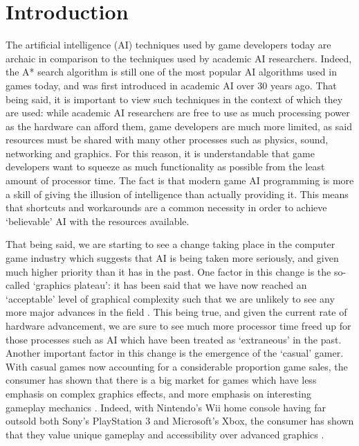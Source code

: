 \documentclass[a4paper,oneside]{report}
\begin{document}
%
%

\chapter{Introduction}

The artificial intelligence (AI) techniques used by game developers today are archaic in comparison to the techniques used by academic AI researchers. Indeed, the A* search algorithm is still one of the most popular AI algorithms used in games today, and was first introduced in academic AI over 30 years ago. That being said, it is important to view such techniques in the context of which they are used: while academic AI researchers are free to use as much processing power as the hardware can afford them, game developers are much more limited, as said resources must be shared with many other processes such as physics, sound, networking and graphics. For this reason, it is understandable that game developers want to squeeze as much functionality as possible from the least amount of processor time. The fact is that modern game AI programming is more a skill of giving the illusion of intelligence than actually providing it. This means that shortcuts and workarounds are a common necessity in order to achieve `believable' AI with the resources available. 

That being said, we are starting to see a change taking place in the computer game industry which suggests that AI is being taken more seriously, and given much higher priority than it has in the past. One factor in this change is the so-called `graphics plateau': it has been said that we have now reached an `acceptable' level of graphical complexity such that we are unlikely to see any more major advances in the field \cite{Sheffield:2008fk}. This being true, and given the current rate of hardware advancement, we are sure to see much more processor time freed up for those processes such as AI which have been treated as `extraneous' in the past. Another important factor in this change is the emergence of the `casual' gamer. With casual games now accounting for a considerable proportion game sales, the consumer has shown that there is a big market for games which have less emphasis on complex graphics effects, and more emphasis on interesting gameplay mechanics \cite{Association:2011uq}. Indeed, with Nintendo's Wii home console having far outsold both Sony's PlayStation 3 and Microsoft's Xbox, the consumer has shown that they value unique gameplay and accessibility over advanced graphics \cite{:2012dq, Nintendo:2012nx, :cr}. 
\end{document}

